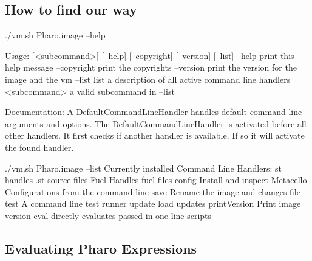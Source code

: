 \documentclass[a4paper,10pt,twoside]{book}
\begin{document}
\subsection{How to find our way}

\begin{code}{}
./vm.sh Pharo.image --help
\end{code}

\begin{code}{}
Usage: [<subcommand>] [--help] [--copyright] [--version] [--list]
	--help       print this help message
	--copyright  print the copyrights
	--version    print the version for the image and the vm
	--list       list a description of all active command line handlers
	<subcommand> a valid subcommand in --list
	
Documentation:
A DefaultCommandLineHandler handles default command line arguments and options.
The DefaultCommandLineHandler is activated before all other handlers. 
It first checks if another handler is available. If so it will activate the found handler.
\end{code}



\begin{code}{}
./vm.sh Pharo.image --list
Currently installed Command Line Handlers:
    st              handles .st source files
    Fuel            Handles fuel files
    config          Install and inspect Metacello Configurations from the command line
    save            Rename the image and changes file
    test            A command line test runner
    update          load updates
    printVersion    Print image version
    eval            directly evaluates passed in one line scripts
\end{code}    
    

\subsection{Evaluating Pharo Expressions}
\end{document}
